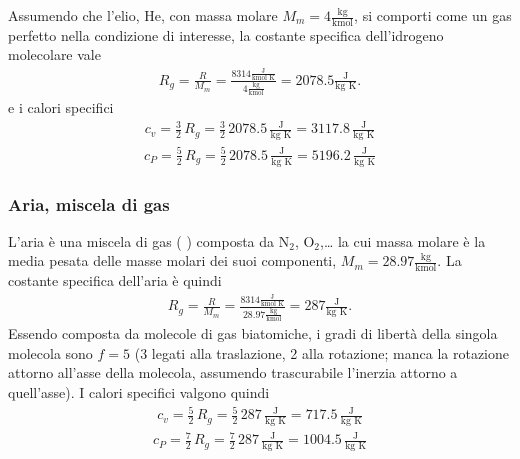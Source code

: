\documentclass[letterpaper,10pt,italian]{jupyterBook}
\begin{document}
\sphinxAtStartPar
Assumendo che l’elio, \(\text{He}\), con massa molare \(M_m = 4 \frac{\text{kg}}{\text{kmol}}\), si comporti come un gas perfetto nella condizione di interesse, la costante specifica dell’idrogeno molecolare vale
\begin{equation*}
\begin{split}R_g = \frac{R}{M_m} = \frac{8314 \frac{\text{J}}{\text{kmol} \text{ K}}}{4 \frac{\text{kg}}{\text{kmol}}} = 2078.5 \frac{\text{J}}{\text{kg} \text{ K}} .\end{split}
\end{equation*}
\sphinxAtStartPar
e i calori specifici
\begin{equation*}
\begin{split}c_v = \frac{3}{2} \, R_g = \frac{3}{2} \, 2078.5 \, \frac{\text{J}}{\text{kg} \text{ K}} = 3117.8 \, \frac{\text{J}}{\text{kg} \text{ K}} \end{split}
\end{equation*}\begin{equation*}
\begin{split}c_P = \frac{5}{2} \, R_g = \frac{5}{2} \, 2078.5 \, \frac{\text{J}}{\text{kg} \text{ K}} = 5196.2 \, \frac{\text{J}}{\text{kg} \text{ K}} \end{split}
\end{equation*}

\subsubsection*{Aria, miscela di gas}

\sphinxAtStartPar
L’aria è una miscela di gas ( ) composta da \(\text{N}_2\), \(\text{O}_2\),… la cui massa molare è la media pesata delle masse molari dei suoi componenti, \(M_m = 28.97 \frac{\text{kg}}{\text{kmol}}\).
La costante specifica dell’aria è quindi
\begin{equation*}
\begin{split}R_g = \frac{R}{M_m} = \frac{8314 \frac{\text{J}}{\text{kmol} \text{ K}}}{28.97 \frac{\text{kg}}{\text{kmol}}} = 287 \frac{\text{J}}{\text{kg} \text{ K}} .\end{split}
\end{equation*}
\sphinxAtStartPar
Essendo composta da molecole di gas biatomiche, i gradi di libertà della singola molecola sono \(f = 5\) (3 legati alla traslazione, 2 alla rotazione; manca la rotazione attorno all’asse della molecola, assumendo trascurabile l’inerzia attorno a quell’asse). I calori specifici valgono quindi
\begin{equation*}
\begin{split}c_v = \frac{5}{2} \, R_g = \frac{5}{2} \, 287 \, \frac{\text{J}}{\text{kg} \text{ K}} =  717.5 \, \frac{\text{J}}{\text{kg} \text{ K}} \end{split}
\end{equation*}\begin{equation*}
\begin{split}c_P = \frac{7}{2} \, R_g = \frac{7}{2} \, 287 \, \frac{\text{J}}{\text{kg} \text{ K}} = 1004.5 \, \frac{\text{J}}{\text{kg} \text{ K}} \end{split}
\end{equation*}
\end{document}
